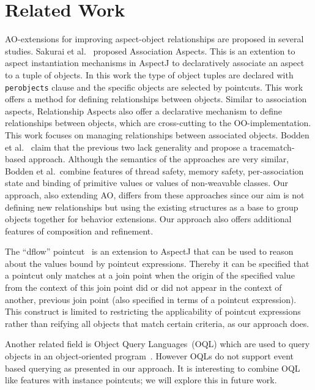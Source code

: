 \documentclass{acm_proc_article-sp}
\begin{document}
\section{Related Work}
AO-extensions for improving aspect-object relationships are proposed in several studies. Sakurai et al.~\cite{sakurai2004association} proposed Association Aspects. This is an extention to aspect instantiation mechanisms in AspectJ to declaratively associate an aspect to a tuple of objects. In this work the type of object tuples are declared with \texttt{perobjects} clause and the specific objects are selected by pointcuts. This work offers a method for defining relationships between objects. Similar to association aspects, Relationship Aspects \cite{pearce2006relationship} also offer a declarative mechanism to define relationships between objects, which are cross-cutting to the OO-implementation. This work focuses on managing relationships between associated objects. Bodden et al.~ \cite{bodden2008relational} claim that the previous two lack generality and propose a tracematch-based approach. Although the semantics of the approaches are very similar, Bodden et al.\ combine features of thread safety, memory safety, per-association state and binding of primitive values or values of non-weavable classes. Our approach, also extending AO, differs from these approaches since our aim is not defining new relationships but using the existing structures as a base to group objects together for behavior extensions. Our approach also offers additional features of composition and refinement.

The ``dflow'' pointcut~\cite{kawauchi:aosd-aosdsec04} is an extension to AspectJ that can be used to reason about the values bound by pointcut expressions. Thereby it can be specified that a pointcut only matches at a join point when the origin of the specified value from the context of this join point did or did not appear in the context of another, previous join point (also specified in terms of a pointcut expression). This construct is limited to restricting the applicability of pointcut expressions rather than reifying all objects that match certain criteria, as our approach does.

Another related field is Object Query Languages~(OQL) which are used to query objects in an object-oriented program~\cite{cluet1998designing}. However OQLs do not support event based querying as presented in our approach. It is interesting to combine  OQL like features with instance pointcuts; we will explore this in future work. 
\end{document}
